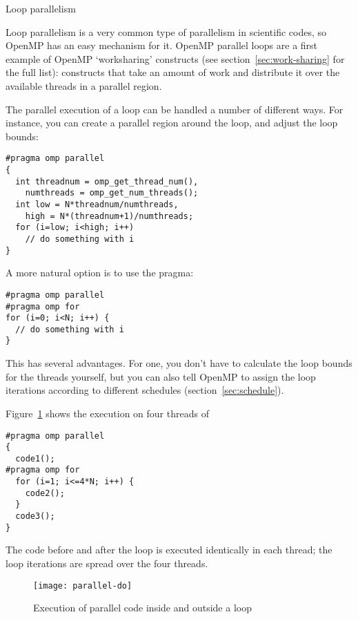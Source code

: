 
 {Loop parallelism}
\label{sec:omp-for}

Loop parallelism is a very common type of parallelism in scientific
codes, so OpenMP has an easy mechanism for it.
OpenMP parallel loops are a first example of OpenMP `worksharing'
constructs (see section~\ref{sec:work-sharing} for the full list):
constructs that take an amount of work and distribute it over the
available threads in a parallel region.

The parallel execution of a loop can be handled a number of different ways.
For instance, you can create a parallel region around the loop, and
adjust the loop bounds:
\begin{verbatim}
#pragma omp parallel
{
  int threadnum = omp_get_thread_num(),
    numthreads = omp_get_num_threads();
  int low = N*threadnum/numthreads,
    high = N*(threadnum+1)/numthreads;
  for (i=low; i<high; i++)
    // do something with i
}
\end{verbatim}

A more natural option is to use the
 pragma:
\begin{verbatim}
#pragma omp parallel
#pragma omp for
for (i=0; i<N; i++) {
  // do something with i
}
\end{verbatim}
This has several advantages. For one, you don't have to calculate the loop bounds
for the threads yourself, but you can also tell OpenMP to assign the loop
iterations according to different schedules (section~\ref{sec:schedule}).

Figure~\ref{fig:omp-par-do} shows the execution on four threads of
\begin{verbatim}
#pragma omp parallel
{
  code1();
#pragma omp for
  for (i=1; i<=4*N; i++) {
    code2();
  }
  code3();
}
\end{verbatim}
The code before and after the loop is executed identically
in each thread; the loop iterations are spread over the four threads.
\begin{figure}[ht]
  \texttt{[image: parallel-do]}
  \caption{Execution of parallel code inside and outside a loop}
  \label{fig:omp-par-do}
\end{figure}

